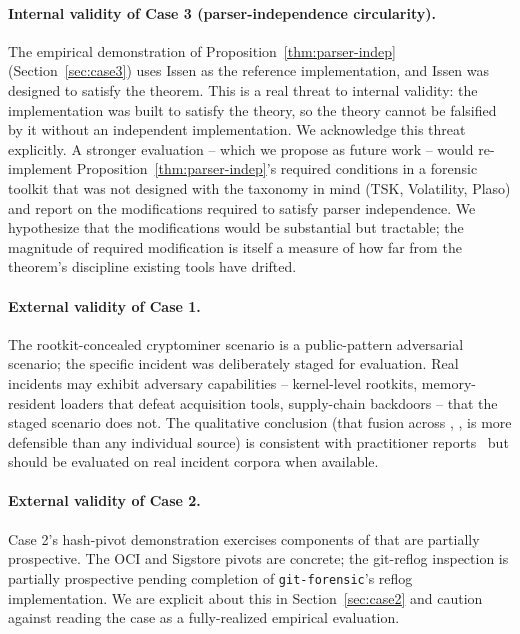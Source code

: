 \paragraph{Internal validity of Case 3 (parser-independence circularity).}
The empirical demonstration of Proposition~\ref{thm:parser-indep}
(Section~\ref{sec:case3}) uses Issen as the reference implementation, and
Issen was designed to satisfy the theorem. This is a real threat to
internal validity: the implementation was built to satisfy the theory, so
the theory cannot be falsified by it without an independent implementation.
We acknowledge this threat explicitly. A stronger evaluation -- which we
propose as future work -- would re-implement Proposition~\ref{thm:parser-indep}'s
required conditions in a forensic toolkit that was not designed with the
taxonomy in mind (TSK, Volatility, Plaso) and report on the modifications
required to satisfy parser independence. We hypothesize that the
modifications would be substantial but tractable; the magnitude of
required modification is itself a measure of how far from the theorem's
discipline existing tools have drifted.

\paragraph{External validity of Case 1.} The rootkit-concealed cryptominer
scenario is a public-pattern adversarial scenario; the specific incident
was deliberately staged for evaluation. Real incidents may exhibit
adversary capabilities -- kernel-level rootkits, memory-resident loaders
that defeat acquisition tools, supply-chain backdoors -- that the staged
scenario does not. The qualitative conclusion (that fusion across ,
,  is more defensible than any individual source) is
consistent with practitioner reports~\cite{cohen2011distributed,case2017memory}
but should be evaluated on real incident corpora when available.

\paragraph{External validity of Case 2.} Case 2's hash-pivot demonstration
exercises components of  that are partially prospective. The OCI and
Sigstore pivots are concrete; the git-reflog inspection is partially
prospective pending completion of \texttt{git-forensic}'s reflog
implementation. We are explicit about this in Section~\ref{sec:case2} and
caution against reading the case as a fully-realized empirical evaluation.

